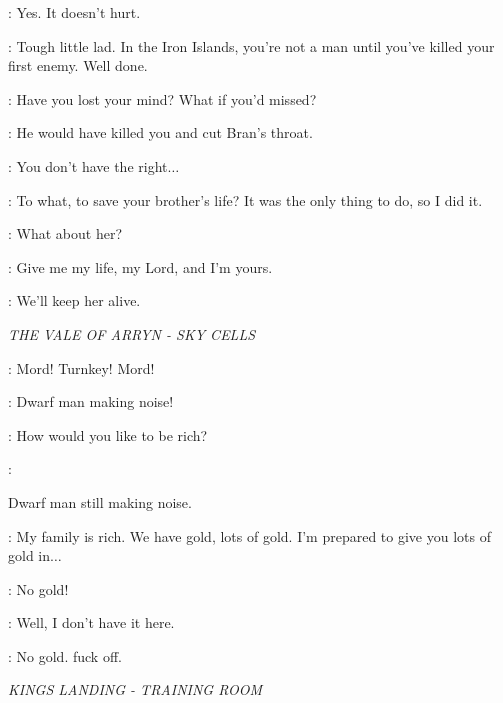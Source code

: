 \BRAN:  Yes. It doesn't hurt. 

\THEON:  Tough little lad. In the Iron Islands, you're not a man until you've killed your first enemy. Well done. 

\ROBB:  Have you lost your mind? What if you'd missed? 

\THEON:  He would have killed you and cut Bran's throat. 

\ROBB:  You don't have the right$\ldots$ 

\THEON:  To what, to save your brother's life? It was the only thing to do, so I did it. 

\ROBB:  What about her? 

\OSHA:  Give me my life, my Lord, and I'm yours. 

\ROBB:  We'll keep her alive. 


\scene

\textit{THE VALE OF ARRYN - SKY CELLS} 


\TYRION:  Mord! Turnkey! Mord! 


\MORD:  Dwarf man making noise!  


\TYRION:  How would you like to be rich? 

\MORD: 

 Dwarf man still making noise. 

\TYRION:  My family is rich. We have gold, lots of gold. I'm prepared to give you lots of gold in$\ldots$ 


\MORD:  No gold! 

\TYRION:  Well, I don't have it here. 

\MORD:   No gold. fuck off. 



\scene

\textit{KINGS LANDING - TRAINING ROOM} 


